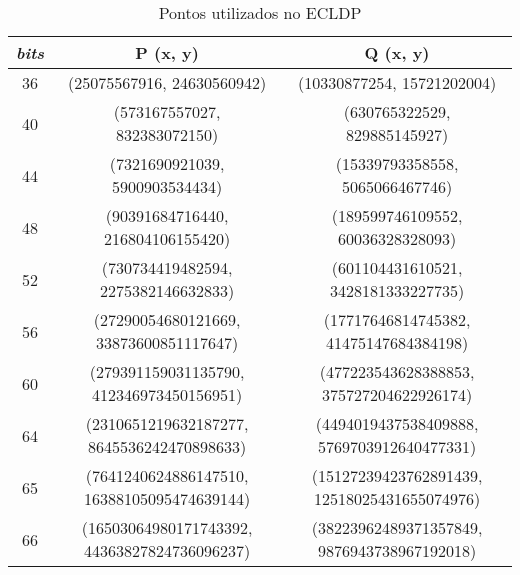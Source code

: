 \begin{anexosenv}
\begin{table}[h]
\centering
\caption{Pontos utilizados no ECLDP}
\label{table:ecldp_points}
\begin{tabular}{|c|c|c|}
\hline
\multicolumn{1}{|c|}{\textit{bits}} & \textbf{P (x, y)} & \textbf{Q (x, y)} \\ \hline
36 & (25075567916, 24630560942) & (10330877254, 15721202004) \\ \hline
40 & (573167557027, 832383072150) & (630765322529, 829885145927) \\ \hline
44 & (7321690921039, 5900903534434) & (15339793358558, 5065066467746) \\ \hline
48 & (90391684716440, 216804106155420) & (189599746109552, 60036328328093) \\ \hline
52 & (730734419482594, 2275382146632833) & (601104431610521, 3428181333227735) \\ \hline
56 & (27290054680121669, 33873600851117647) & (17717646814745382, 41475147684384198) \\ \hline
60 & (279391159031135790, 412346973450156951) & (477223543628388853, 375727204622926174) \\ \hline
64 & (2310651219632187277, 8645536242470898633) & (4494019437538409888, 5769703912640477331) \\ \hline
65 & (7641240624886147510, 16388105095474639144) & (15127239423762891439, 12518025431655074976) \\ \hline
66 & (16503064980171743392, 44363827824736096237) & (38223962489371357849, 9876943738967192018) \\ \hline
\end{tabular}
\end{table}

\end{anexosenv}
